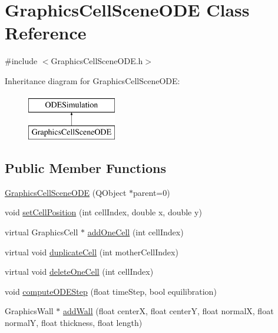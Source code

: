\hypertarget{class_graphics_cell_scene_o_d_e}{\section{\-Graphics\-Cell\-Scene\-O\-D\-E \-Class \-Reference}
\label{class_graphics_cell_scene_o_d_e}
}


{\ttfamily \#include $<$\-Graphics\-Cell\-Scene\-O\-D\-E.\-h$>$}

\-Inheritance diagram for \-Graphics\-Cell\-Scene\-O\-D\-E\-:\begin{figure}[H]
\begin{center}
\leavevmode
\includegraphics[height=2.000000cm]{class_graphics_cell_scene_o_d_e}
\end{center}
\end{figure}
\subsection*{\-Public \-Member \-Functions}
\begin{DoxyCompactItemize}
\item 
\hyperlink{class_graphics_cell_scene_o_d_e_a4b93b6c25c3199a42f9464cae8a0cdc6}{\-Graphics\-Cell\-Scene\-O\-D\-E} (\-Q\-Object $\ast$parent=0)
\item 
void \hyperlink{class_graphics_cell_scene_o_d_e_ac2d1365626ed2d7492c8a78e0098efd5}{set\-Cell\-Position} (int cell\-Index, double x, double y)
\item 
virtual \-Graphics\-Cell $\ast$ \hyperlink{class_graphics_cell_scene_o_d_e_a77f0a529438123786cca3050eec57719}{add\-One\-Cell} (int cell\-Index)
\item 
virtual void \hyperlink{class_graphics_cell_scene_o_d_e_ae66f4605023f6b82360b2ade0496d098}{duplicate\-Cell} (int mother\-Cell\-Index)
\item 
virtual void \hyperlink{class_graphics_cell_scene_o_d_e_a1d7fdc85e9cba222a530e473751aed21}{delete\-One\-Cell} (int cell\-Index)
\item 
void \hyperlink{class_graphics_cell_scene_o_d_e_ade7cd7d3f3c55a2a474d80eb63736698}{compute\-O\-D\-E\-Step} (float time\-Step, bool equilibration)
\item 
\-Graphics\-Wall $\ast$ \hyperlink{class_graphics_cell_scene_o_d_e_aea5ea730a60d9f141623e2f39a8d599f}{add\-Wall} (float center\-X, float center\-Y, float normal\-X, float normal\-Y, float thickness, float length)
\end{DoxyCompactItemize}


